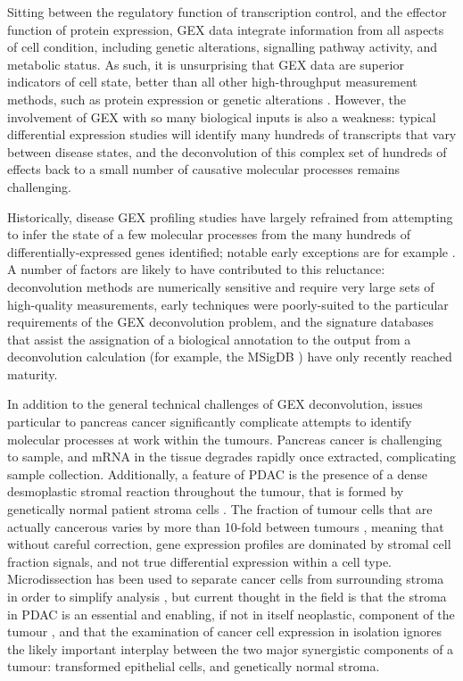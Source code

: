 \documentclass[dissertation.tex]{subfiles}
\begin{document}
Sitting between the regulatory function of transcription control, and the effector function of protein expression, \gls{GEX} data integrate information from all aspects of cell condition, including genetic alterations, signalling pathway activity, and metabolic status.  As such, it is unsurprising that \gls{GEX} data are superior indicators of cell state, better than all other high-throughput measurement methods, such as protein expression or genetic alterations \cite{Ray2014}.  However, the involvement of \gls{GEX} with so many biological inputs is also a weakness: typical differential expression studies will identify many hundreds of transcripts that vary between disease states, and the deconvolution of this complex set of hundreds of effects back to a small number of causative molecular processes remains challenging.

Historically, disease \gls{GEX} profiling studies have largely refrained from attempting to infer the state of a few molecular processes from the many hundreds of differentially-expressed genes identified; notable early exceptions are for example .  A number of factors are likely to have contributed to this reluctance: deconvolution methods are numerically sensitive and require very large sets of high-quality measurements, early techniques were poorly-suited to the particular requirements of the \gls{GEX} deconvolution problem, and the signature databases that assist the assignation of a biological annotation to the output from a deconvolution calculation (for example, the \acrshort{MSigDB} \cite{Subramanian2005}) have only recently reached maturity.

In addition to the general technical challenges of \gls{GEX} deconvolution, issues particular to pancreas cancer significantly complicate attempts to identify molecular processes at work within the tumours.  Pancreas cancer is challenging to sample, and mRNA in the tissue degrades rapidly once extracted, complicating sample collection.  Additionally, a feature of \gls{PDAC} is the presence of a dense desmoplastic stromal reaction throughout the tumour, that is formed by genetically normal patient stroma cells \cite{Mahadevan2007}.  The fraction of tumour cells that are actually cancerous varies by more than 10-fold between tumours \cite{Biankin2012}, meaning that without careful correction, gene expression profiles are dominated by stromal cell fraction signals, and not true differential expression within a cell type.  Microdissection has been used to separate cancer cells from surrounding stroma in order to simplify analysis \cite{Collisson2011}, but current thought in the field is that the stroma in \gls{PDAC} is an essential and enabling, if not in itself neoplastic, component of the tumour \cite{Mahadevan2007}, and that the examination of cancer cell expression in isolation ignores the likely important interplay between the two major synergistic components of a tumour: transformed epithelial cells, and genetically normal stroma.
\end{document}
